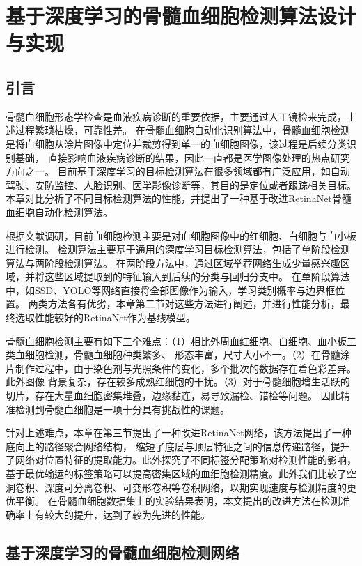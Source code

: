 
\chapter{基于深度学习的骨髓血细胞检测算法设计与实现}
\section{引言}
骨髓血细胞形态学检查是血液疾病诊断的重要依据，主要通过人工镜检来完成，上述过程繁琐枯燥，可靠性差。
在骨髓血细胞自动化识别算法中，骨髓血细胞检测是将血细胞从涂片图像中定位并裁剪得到单一的血细胞图像，该过程是后续分类识别基础，
直接影响血液疾病诊断的结果，因此一直都是医学图像处理的热点研究方向之一。
目前基于深度学习的目标检测算法在很多领域都有广泛应用，如自动驾驶、安防监控、人脸识别、医学影像诊断等，其目的是定位或者跟踪相关目标。
本章对比分析了不同目标检测算法的性能，并提出了一种基于改进RetinaNet骨髓血细胞自动化检测算法。

根据文献调研，目前血细胞检测主要是对血细胞图像中的红细胞、白细胞与血小板进行检测。
检测算法主要基于通用的深度学习目标检测算法，包括了单阶段检测算法与两阶段检测算法。
在两阶段方法中，通过区域举荐网络生成少量感兴趣区域，并将这些区域提取到的特征输入到后续的分类与回归分支中。
在单阶段算法中，如SSD、YOLO等网络直接将全部图像作为输入，学习类别概率与边界框位置。
两类方法各有优劣，本章第二节对这些方法进行阐述，并进行性能分析，最终选取性能较好的RetinaNet作为基线模型。

骨髓血细胞检测主要有如下三个难点：（1）相比外周血红细胞、白细胞、血小板三类血细胞检测，骨髓血细胞种类繁多、
形态丰富，尺寸大小不一。（2）在骨髓涂片制作过程中，由于染色剂与光照条件的变化，多个批次的数据存在着色彩差异。此外图像
背景复杂，存在较多成熟红细胞的干扰。（3）对于骨髓细胞增生活跃的切片，存在大量血细胞密集堆叠，边缘黏连，易导致漏检、错检等问题。
因此精准检测到骨髓血细胞是一项十分具有挑战性的课题。

针对上述难点，本章在第三节提出了一种改进RetinaNet网络，该方法提出了一种底向上的路径聚合网络结构，
缩短了底层与顶层特征之间的信息传递路径，提升了网络对位置特征的提取能力。此外探究了不同标签分配策略对检测性能的影响，
基于最优输运的标签策略可以提高密集区域的血细胞检测精度。此外我们比较了空洞卷积、深度可分离卷积、可变形卷积等卷积网络，以期实现速度与检测精度的更优平衡。
在骨髓血细胞数据集上的实验结果表明，本文提出的改进方法在检测准确率上有较大的提升，达到了较为先进的性能。

\section{基于深度学习的骨髓血细胞检测网络}

